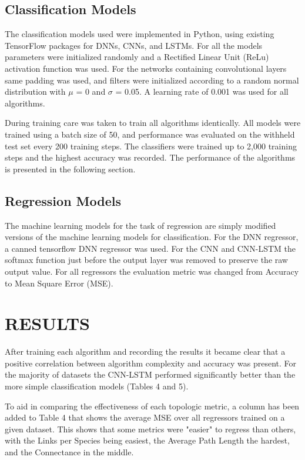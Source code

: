 \documentclass[letterpaper, 10 pt, conference]{ieeeconf}  %
\begin{document}
\begin{table}
\begin{tabular}{|c|c|c|c|}
      \end{tabular}
    \end{table}
    

\subsection{Classification Models}
	The classification models used were implemented in Python, using existing TensorFlow packages for DNNs, CNNs, and LSTMs. For all the models parameters were initialized randomly and a Rectified Linear Unit (ReLu) activation function was used. For the networks containing convolutional layers same padding was used, and filters were initialized according to a random normal distribution with $\mu$ = 0 and $\sigma$ = 0.05. A learning rate of 0.001 was used for all algorithms. 
    
    During training care was taken to train all algorithms identically. All models were trained using a batch size of 50, and performance was evaluated on the withheld test set every 200 training steps. The classifiers were trained up to 2,000 training steps and the highest accuracy was recorded. The performance of the algorithms is presented in the following section. 
    
\subsection{Regression Models}
    The machine learning models for the task of regression are simply modified versions of the machine learning models for classification. For the DNN regressor, a canned tensorflow DNN regressor was used. For the CNN and CNN-LSTM the softmax function just before the output layer was removed to preserve the raw output value.  For all regressors the evaluation metric was changed from Accuracy to Mean Square Error (MSE). 

\section{RESULTS}
	After training each algorithm and recording the results it became clear that a positive correlation between algorithm complexity and accuracy was present. For the majority of datasets the CNN-LSTM performed significantly better than the more simple classification models (Tables 4 and 5).
	
    To aid in comparing the effectiveness of each topologic metric, a column has been added to Table 4 that shows the average MSE over all regressors trained on a given dataset. This shows that some metrics were "easier" to regress than others, with the Links per Species being easiest, the Average Path Length the hardest, and the Connectance in the middle. 
    
\end{document}

